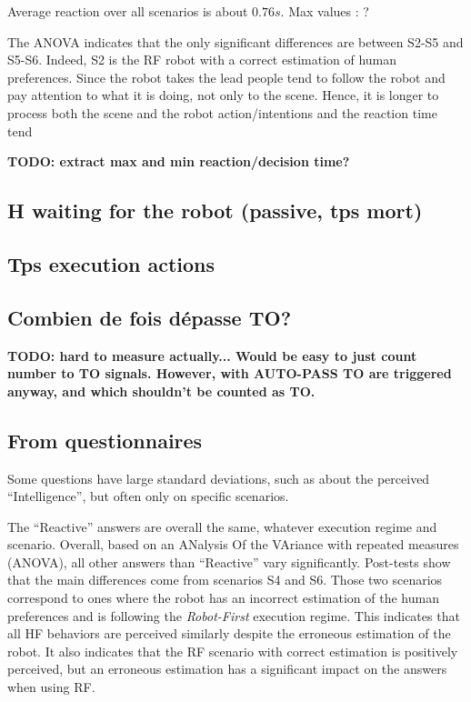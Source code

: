 Average reaction over all scenarios is about $0.76s$. Max values : ?

The ANOVA indicates that the only significant differences are between S2-S5 and S5-S6. 
Indeed, S2 is the RF robot with a correct estimation of human preferences. Since the robot takes the lead people tend to follow the robot and pay attention to what it is doing, not only to the scene. Hence, it is longer to process both the scene and the robot action/intentions and the reaction time tend 

\textbf{TODO: extract max and min reaction/decision time?}


\subsection*{H waiting for the robot (passive, tps mort)}

\subsection*{Tps execution actions}

\subsection*{Combien de fois dépasse TO?}
\textbf{TODO: hard to measure actually... Would be easy to just count number to TO signals. However, with AUTO-PASS TO are triggered anyway, and which shouldn't be counted as TO.}

\subsection{From questionnaires}

Some questions have large standard deviations, such as about the perceived ``Intelligence'', but often only on specific scenarios.

The ``Reactive'' answers are overall the same, whatever execution regime and scenario. 
Overall, based on an ANalysis Of the VAriance with repeated measures (ANOVA), all other answers than ``Reactive'' vary significantly. Post-tests show that the main differences come from scenarios S4 and S6. Those two scenarios correspond to ones where the robot has an incorrect estimation of the human preferences and is following the \textit{Robot-First} execution regime. This indicates that all HF behaviors are perceived similarly despite the erroneous estimation of the robot. It also indicates that the RF scenario with correct estimation is positively perceived, but an erroneous estimation has a significant impact on the answers when using RF.  

